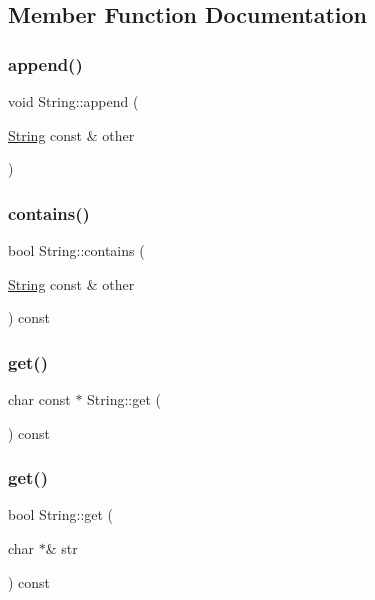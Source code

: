 \subsection{Member Function Documentation}
\mbox{\label{classString_a8a191fafb7af689d86f50423e97e60d7}} 
\subsubsection{\texorpdfstring{append()}{append()}}
{\footnotesize\ttfamily void String\+::append (\begin{DoxyParamCaption}\item[{\hyperlink{classString}{String} const \&}]{other }\end{DoxyParamCaption})}

\mbox{\label{classString_a16b809e6c0a80889b2ee8e753003ab70}} 
\subsubsection{\texorpdfstring{contains()}{contains()}}
{\footnotesize\ttfamily bool String\+::contains (\begin{DoxyParamCaption}\item[{\hyperlink{classString}{String} const \&}]{other }\end{DoxyParamCaption}) const}

\mbox{\label{classString_ac7459c7a9d75bdcc53d44a0c5ec7a182}} 
\subsubsection{\texorpdfstring{get()}{get()}\hspace{0.1cm}{\footnotesize\ttfamily [1/2]}}
{\footnotesize\ttfamily char const  $\ast$ String\+::get (\begin{DoxyParamCaption}{ }\end{DoxyParamCaption}) const}

\mbox{\label{classString_ad11aaf7841686006dd6840a5fab5664e}} 
\subsubsection{\texorpdfstring{get()}{get()}\hspace{0.1cm}{\footnotesize\ttfamily [2/2]}}
{\footnotesize\ttfamily bool String\+::get (\begin{DoxyParamCaption}\item[{char $\ast$\&}]{str }\end{DoxyParamCaption}) const}

